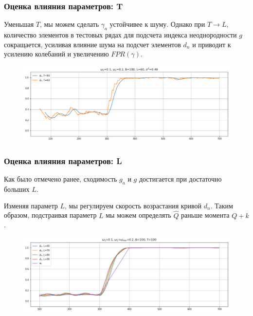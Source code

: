 \documentclass[11pt]{beamer}
\begin{document}
	\begin{frame}
		\frametitle{Оценка влияния параметров: T}
		Уменьшая $ T $, мы можем сделать $ \gamma_a $ устойчивее к шуму. Однако при $ T \rightarrow L $, количество элементов в тестовых рядах для подсчета индекса неоднородности $ g $ сокращается, усиливая влияние шума на подсчет элементов $ d_{n} $ и приводит к усилению колебаний и увеличению $ FPR(\gamma) $.
		
		\begin{figure}[b]
			\centering
			\includegraphics[width=\linewidth]{imgs/decreasing_T.png}
		\end{figure}
	\end{frame}

	\begin{frame}
		\frametitle{Оценка влияния параметров: L}
		Как было отмечено ранее, сходимость $ g_a $ и $ g $ достигается при достаточно больших $ L $. 
		
		\bigskip
		
		Изменяя параметр $ L $, мы регулируем скорость возрастания кривой $ d_{n} $. Таким образом, подстраивая параметр $ L $ мы можем определять $ \hat{Q} $ раньше момента $ Q + k $.
		
		\begin{figure}[b]
			\centering
			\includegraphics[width=\linewidth]{imgs/row_diff_L.png}
		\end{figure}
		
		
	\end{frame}
\end{document}
